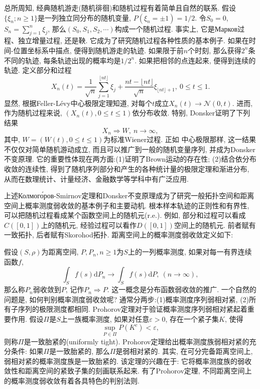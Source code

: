 \documentclass[a4paper,AutoFakeBold,oneside,12pt]{article}
\begin{document}
总所周知, 经典随机游走(随机徘徊)和随机过程有着简单且自然的联系. 假设$\{\xi_n;n\geqslant 1\}$是一列独立同分布的随机变量, $P(\xi_n=\pm 1) = 1/2$. 令$S_0 = 0$, $S_n = \sum_{j=1}^n\xi_j$, 那么$(S_0,S_1,S_2,\cdots)$构成一个随机过程. 事实上, 它是Марков过程、独立增量过程, 还是鞅. 它成为了研究随机过程各种性质的基本例子. 如果在时间-位置坐标系中描点, 便得到随机游走的轨迹. 如果限于前$n$个时刻, 那么获得$2^n$条不同的轨迹, 每条轨迹出现的概率均是$1/2^n$.  如果把相邻的点连起来, 便得到连续的轨迹. 定义部分和过程
\begin{equation}
	X_n(t) = \frac{1}{\sqrt{n}}\sum_{j = 1}^{\lfloor nt\rfloor}\xi_j + \frac{nt-\lfloor nt\rfloor}{\sqrt{n}}\xi_{\lfloor nt\rfloor+1},~0\leqslant t\leqslant 1.
\end{equation}
显然, 根据Feller-Lévy中心极限定理知道, 对每个$t$成立$X_n(t)\to \mathcal{N}(0,t)$. 进而, 作为随机过程来说, $(X_n(t),0\leqslant t\leqslant 1)$依分布收敛. 特别, Donsker证明了下列结果
\begin{equation}
	X_n\Rightarrow W,~n\to\infty,
\end{equation}
其中, $W = (W(t),0\leqslant t\leqslant 1)$为标准Wiener过程. 正如
中心极限那样, 这一结果不仅仅对简单随机游动成立, 而且可以推广到一般的随机变量序列, 并成为Donsker不变原理. 它的重要性体现在两方面:(1)证明了Brown运动的存在性; (2)结合依分布收敛的连续性, 得到了随机序列部分和产生的各种统计量的极限定理和渐进分布, 从而在数理统计、计量经济、金融数学等学科中有广泛应用.

上述Колмого́ров-Smirnov定理和Donsker不变原理成为了研究一般拓扑空间和距离空间上概率测度弱收敛的基本例子和主要动机. 根本样本轨迹的正则性和有界性, 可以把随机过程看成某个函数空间上的随机元(r.e.). 例如, 部分和过程可以看成$C([0,1])$上的随机元, 经验过程可以看作$D([0,1])$空间上的随机元. 前者赋有一致拓扑, 后者赋有Skorohod拓扑. 距离空间上的概率测度弱收敛定义如下:

假设$(S,\rho)$为距离空间, $P,P_n, n\geqslant 1$为$S$上的一列概率测度, 如果对每一有界连续函数$f$,
\begin{equation}
	\int_Sf(s)\mathrm{d}P_n\to\int_Sf(s)\mathrm{d}P,~(n\to\infty),
\end{equation}
那么称$P_n$弱收敛到$P$, 记作$P_n\Rightarrow P$. 这一概念是分布函数弱收敛的推广. 一个自然的问题是, 如何判别概率测度弱收敛呢? 通常分两步:(1)概率测度序列弱相对紧, (2)所有子序列的极限测度都相同. Prohorov定理对于验证概率测度序列弱相对紧起着重要作用. 假设$\Pi$是$S$上一族概率测度, 如果对任意$\varepsilon>0$, 存在一个紧子集$K$, 使得\begin{equation}
	\sup_{P\in\Pi}P(K^c)<\varepsilon,
\end{equation}
则称$\Pi$是一致胎紧的(uniformly tight). Prohorov定理给出概率测度族弱相对紧的充分条件: 如果$\Pi$是一致胎紧的, 那么$\Pi$是弱相对紧的. 其实, 在可分完备距离空间上, 弱相对紧的概率测度族是一致胎紧的. 该定理的兴趣在于: 它将概率测度族的弱收敛性和距离空间的紧致子集的刻画联系起来. 有了Prohorov定理, 不同距离空间上的概率测度弱收敛有着各具特色的判别法则.
\end{document}
